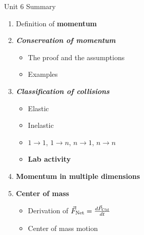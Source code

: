 \documentclass{beamer}
\begin{document}
\begin{frame}{Unit 6 Summary}
\begin{enumerate}
\item Definition of \alert{\textbf{momentum}}
\item \alert{\textbf{\textit{Conservation of momentum}}}
\begin{itemize}
\item The proof and the assumptions
\item Examples
\end{itemize}
\item \alert{\textbf{\textit{Classification of collisions}}}
\begin{itemize}
\item Elastic
\item Inelastic
\item $1 \rightarrow 1$, $1 \rightarrow n$, $n \rightarrow 1$, $n \rightarrow n$
\item \textbf{Lab activity}
\end{itemize}
\item \textbf{Momentum in multiple dimensions}
\item \textbf{Center of mass}
\begin{itemize}
\item Derivation of $\vec{F}_{\rm Net} = \frac{d\vec{P}_{\rm CM}}{dt}$
\item Center of mass motion
\end{itemize}
\end{enumerate}
\end{frame}
\end{document}
